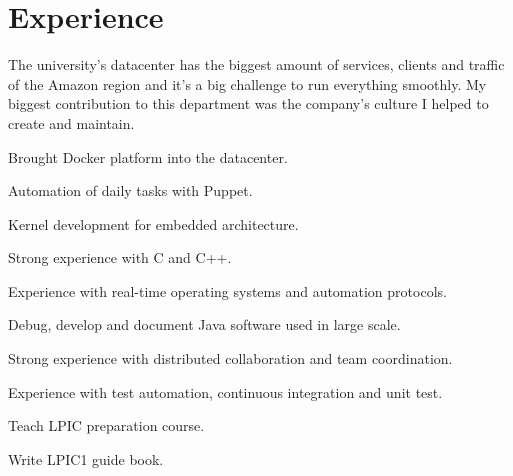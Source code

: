 \documentclass[]{deedy-resume-openfont}
\begin{document}
\begin{minipage}[t]{0.66\textwidth} 

\section{Experience}
\sectionsep
The university's datacenter has the biggest amount of services, clients and
traffic of the Amazon region and it's a big challenge to run everything smoothly.
My biggest contribution to this department was the company's culture I helped to
create and maintain.
\sectionsep
\begin{tightemize}
\item Brought Docker platform into the datacenter.
\item Automation of daily tasks with Puppet.
\end{tightemize}
\sectionsep

\begin{tightemize}
\item Kernel development for embedded architecture.
\item Strong experience with C and C++.
\item Experience with real-time operating systems and automation protocols.
\end{tightemize}
\sectionsep

\begin{tightemize}
\item Debug, develop and document Java software used in large scale.
\item Strong experience with distributed collaboration and team coordination.
\item Experience with test automation, continuous integration and unit test.
\end{tightemize}
\sectionsep

\begin{tightemize}
\item Teach LPIC preparation course.
\item Write LPIC1 guide book.
\end{tightemize}
\sectionsep


\end{minipage}
\end{document}
